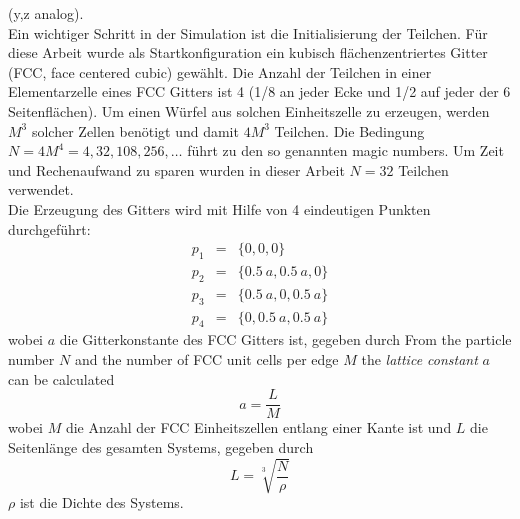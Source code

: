 \documentclass[12pt]{article}
\begin{document}
(y,z analog).\\
Ein wichtiger Schritt in der Simulation ist die Initialisierung der Teilchen. Für diese Arbeit wurde als 
Startkonfiguration ein kubisch flächenzentriertes Gitter (FCC, face centered cubic) gewählt. 
Die Anzahl der Teilchen in einer 
Elementarzelle eines FCC Gitters ist 4 (1/8 an jeder Ecke und 1/2 auf jeder der 6 Seitenflächen). Um einen Würfel aus solchen
Einheitszelle zu erzeugen, werden $M^3$ solcher Zellen benötigt und damit $4M^3$ Teilchen. Die Bedingung 
$N = 4M^4 = 4,32,108,256,\ldots$ führt zu den so genannten magic numbers. Um Zeit und Rechenaufwand zu sparen wurden in dieser
Arbeit $N=32$ Teilchen verwendet.\\
Die Erzeugung des Gitters wird mit Hilfe von 4 eindeutigen Punkten durchgeführt:
\begin{eqnarray*}
    p_1 &=& \{0,0,0\}\\
    p_2 &=& \{0.5 \ a,0.5 \ a,0\}\\
    p_3 &=& \{0.5 \ a,0,0.5 \ a\}\\
    p_4 &=& \{0,0.5 \ a,0.5 \ a\}
\end{eqnarray*}
wobei $a$ die Gitterkonstante des FCC Gitters ist, gegeben durch 
From the particle number $N$ and the number of FCC unit cells per edge $M$ the \textit{lattice constant} $a$ can be calculated
\begin{equation}
    a = \frac{L}{M}
\end{equation}
wobei $M$ die Anzahl der FCC Einheitszellen entlang einer Kante ist und $L$ die Seitenlänge des gesamten Systems, gegeben durch 
\begin{equation}
    L = \sqrt[3]{\frac{N}{\rho}}
\end{equation}
$\rho$ ist die Dichte des Systems. 
\end{document}
